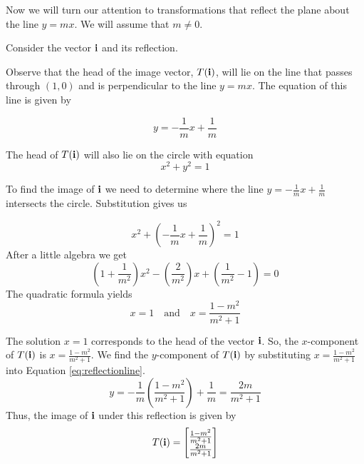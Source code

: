 \documentclass{ximera}
\renewcommand{\vec}[1]{{\bf #1}}
\begin{document}
  Now we will turn our attention to transformations that reflect the plane about the line $y=mx$.  We will assume that $m\neq 0$.
  
  Consider the vector $\vec{i}$ and its reflection. 
\begin{image}[2.2in]
  \end{image}
   
   
   
   Observe that the head of the image vector, $T(\vec{i})$, will lie on the line that passes through $(1,0)$ and is perpendicular to the line $y=mx$.  The equation of this line is given by
   
   \begin{equation}\label{eq:reflectionline} 
   y=-\frac{1}{m}x+\frac{1}{m}
   \end{equation}
   
 The head of $T(\vec{i})$ will also lie on the circle with equation
   $$x^2+y^2=1$$
   
   
   To find the image of $\vec{i}$ we need to determine where the line  $y=-\frac{1}{m}x+\frac{1}{m}$ intersects the circle.  Substitution gives us
   
   $$x^2+\left(-\frac{1}{m}x+\frac{1}{m}\right)^2=1$$
   After a little algebra we get
   $$\left(1+\frac{1}{m^2}\right)x^2-\left(\frac{2}{m^2}\right)x+\left(\frac{1}{m^2}-1\right)=0$$
   The quadratic formula yields 
   $$x=1\quad\text{and}\quad x=\frac{1-m^2}{m^2+1}$$
   
   The solution $x=1$ corresponds to the head of the vector $\vec{i}$.  So, the $x$-component of $T(\vec{i})$ is $x=\frac{1-m^2}{m^2+1}$.  We find the $y$-component of $T(\vec{i})$ by
   substituting $x=\frac{1-m^2}{m^2+1}$ into Equation \ref{eq:reflectionline}.
   $$ y=-\frac{1}{m}\left(\frac{1-m^2}{m^2+1}\right)+\frac{1}{m}=\frac{2m}{m^2+1}$$
   Thus, the image of $\vec{i}$ under this reflection is given by
   $$T(\vec{i})=\begin{bmatrix}\frac{1-m^2}{m^2+1}\\\frac{2m}{m^2+1}\end{bmatrix}$$
   
\end{document}
